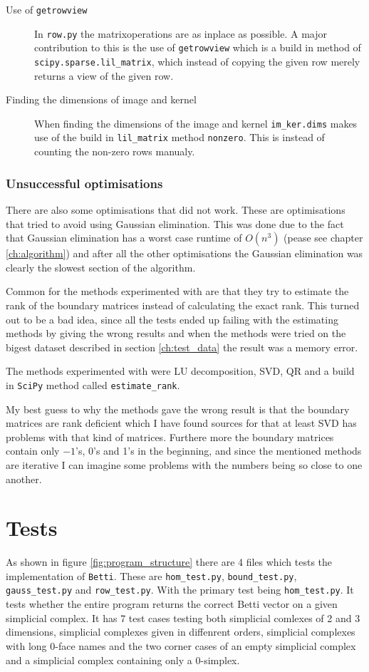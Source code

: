 \documentclass[11pt,a4paper,twoside, openright]{report}
\begin{document}
\begin{description}
\item[Use of \texttt{getrowview}] In \texttt{row.py} the matrixoperations are as inplace as possible. A major contribution to this is the use of \texttt{getrowview} which is a build in method of \texttt{scipy.sparse.lil\_matrix}, which instead of copying the given row merely returns a view of the given row. 
\item[Finding the dimensions of image and kernel] When finding the dimensions of the image and kernel \texttt{im\_ker.dims} makes use of the build in \texttt{lil\_matrix} method \texttt{nonzero}. This is instead of counting the non-zero rows manualy.
\end{description}
\subsubsection{Unsuccessful optimisations}
There are also some optimisations that did not work. These are optimisations that tried to avoid using Gaussian elimination. This was done due to the fact that Gaussian elimination has a worst case runtime of $O(n^3)$ (pease see chapter \ref{ch:algorithm}) and after all the other optimisations the Gaussian elimination was clearly the slowest section of the algorithm.

Common for the methods experimented with are that they try to estimate the rank of the boundary matrices instead of calculating the exact rank. This turned out to be a bad idea, since all the tests ended up failing with the estimating methods by giving the wrong results and when the methods were tried on the bigest dataset described in section \ref{ch:test_data} the result was a memory error. 

The methods experimented with were LU decomposition, SVD, QR and a build in \texttt{SciPy} method called \texttt{estimate\_rank}.

My best guess to why the methods gave the wrong result is that the boundary matrices are rank deficient which I have found sources for that at least SVD \cite{wikiSVD} has problems with that kind of matrices. Furthere more the boundary matrices contain only $-1$'s, 0's and 1's in the beginning, and since the mentioned methods are iterative I can imagine some problems with the numbers being so close to one another.
\section{Tests}
As shown in figure \ref{fig:program_structure} there are 4 files which tests the implementation of \texttt{Betti}. These are \texttt{hom\_test.py}, \texttt{bound\_test.py}, \texttt{gauss\_test.py} and \texttt{row\_test.py}. With the primary test being \texttt{hom\_test.py}. It tests whether the entire program returns the correct Betti vector on a given simplicial complex. It has 7 test cases testing both simplicial comlexes of 2 and 3 dimensions, simplicial complexes given in diffenrent orders, simplicial complexes with long 0-face names and the two corner cases of an empty simplicial complex and a simplicial complex containing only a 0-simplex. 
\end{document}
